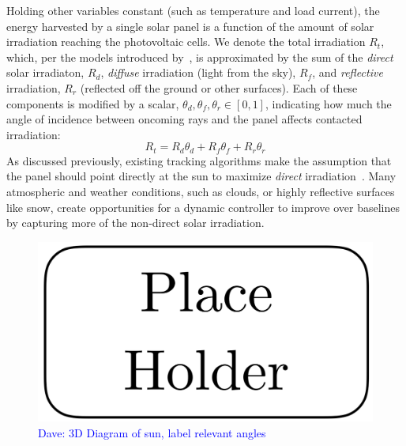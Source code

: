 \documentclass[11pt]{article}
\newcommand{\dnote}[1]{\textcolor{blue}{Dave: #1}}
\begin{document}
Holding other variables constant (such as temperature and load current), the energy harvested by a single solar panel is a function of the amount of solar irradiation reaching the photovoltaic cells. We denote the total irradiation $R_t$, which, per the models introduced by~\citet{kamali2006estimating}, is approximated by the sum of the {\it direct} solar irradiaton, $R_d$, {\it diffuse} irradiation (light from the sky), $R_f$, and {\it reflective} irradiation, $R_r$ (reflected off the ground or other surfaces). Each of these components is modified by a scalar, $\theta_d, \theta_f, \theta_r \in [0,1]$, indicating how much the angle of incidence between oncoming rays and the panel affects contacted irradiation:
\begin{equation}
R_t = R_d \theta_d + R_f \theta_f + R_r \theta_r
\label{eq:total_rads}
\end{equation}
As discussed previously, existing tracking algorithms make the assumption that the panel should point directly at the sun to maximize {\it direct} irradiation~\cite{Grena2008,Grena2012,reda2004solar}. Many atmospheric and weather conditions, such as clouds, or highly reflective surfaces like snow, create opportunities for a dynamic controller to improve over baselines by capturing more of the non-direct solar irradiation.

\begin{figure}
\begin{center}
\includegraphics[scale=0.3]{figures/placeholder.png}
\caption{\dnote{3D Diagram of sun, label relevant angles}}
\end{center}
\end{figure}


\end{document}
